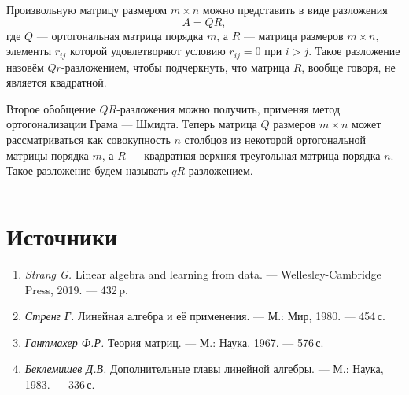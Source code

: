 \documentclass[11pt,a4paper]{article}
\providecommand{\tightlist}{%
      \setlength{\itemsep}{0pt}\setlength{\parskip}{0pt}}
\begin{document}
Произвольную матрицу размером \(m \times n\) можно представить в виде
разложения \[
  A = QR,
\] где \(Q\) --- ортогональная матрица порядка \(m\), а \(R\) ---
матрица размеров \(m \times n\), элементы \(r_{ij}\) которой
удовлетворяют условию \(r_{ij}=0\) при \(i>j\). Такое разложение назовём
\(Qr\)-разложением, чтобы подчеркнуть, что матрица \(R\), вообще говоря,
не является квадратной.

Второе обобщение \(QR\)-разложения можно получить, применяя метод
ортогонализации Грама --- Шмидта. Теперь матрица \(Q\) размеров
\(m \times n\) может рассматриваться как совокупность \(n\) столбцов из
некоторой ортогональной матрицы порядка \(m\), а \(R\) --- квадратная
верхняя треугольная матрица порядка \(n\). Такое разложение будем
называть \(qR\)-разложением.

    \begin{center}\rule{0.5\linewidth}{0.5pt}\end{center}

    \hypertarget{ux438ux441ux442ux43eux447ux43dux438ux43aux438}{%
\section{Источники}\label{ux438ux441ux442ux43eux447ux43dux438ux43aux438}}

\begin{enumerate}
\def\labelenumi{\arabic{enumi}.}
\tightlist
\item
  \emph{Strang G.} Linear algebra and learning from data. ---
  Wellesley-Cambridge Press, 2019. --- 432\,p.
\item
  \emph{Стренг Г.} Линейная алгебра и её применения. --- М.: Мир, 1980.
  --- 454\,с.
\item
  \emph{Гантмахер Ф.Р.} Теория матриц. --- М.: Наука, 1967. --- 576\,с.
\item
  \emph{Беклемишев Д.В.} Дополнительные главы линейной алгебры. --- М.:
  Наука, 1983. --- 336\,с.
\end{enumerate}


    
    
    
\end{document}
